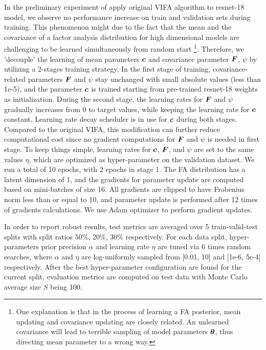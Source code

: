 \documentclass[10pt]{article} %
\begin{document}
In the preliminary experiment of apply original VIFA algorithm to resnet-18 model, we observe no performance increase on train and validation sets during training. This phenomenon might due to the fact that the mean and the covariance of a factor analysis distribution for high dimensional models are challenging to be learned simultaneously from random start \footnote{One explanation is that in the process of learning a FA posterior, mean updating and covariance updating are closely related. An unlearned covariance will lead to terrible sampling of model parameters ${\bm{\theta}}$, thus directing mean parameter to a wrong way.}. Therefore, we 'decouple' the learning of mean parameters ${\bm{c}}$ and covariance parameter ${\bm{F}}$, $\psi$ by utilizing a 2-stages training strategy. In the first stage of training, covariance-related parameters ${\bm{F}}$ and $\psi$ stay unchanged with small absolute values (less than 1e-5), and the parameter ${\bm{c}}$ is trained starting from pre-trained resnet-18 weights as initialization. During the second stage, the learning rates for ${\bm{F}}$ and $\psi$ gradually increases from 0 to target values, while keeping the learning rate for ${\bm{c}}$ constant. Learning rate decay scheduler is in use for ${\bm{c}}$ during both stages. Compared to the original VIFA, this modification can further reduce computational cost since no gradient computations for ${\bm{F}}$ and $\psi$ is needed in first stage. To keep things simple, learning rates for ${\bm{c}}$, ${\bm{F}}$, and $\psi$ are set to the same values $\eta$, which are optimized as hyper-parameter on the validation dataset. We run a total of 10 epochs, with 2 epochs in stage 1. The FA distribution has a latent dimension of 1, and the gradients for parameter update are computed based on mini-batches of size 16. All gradients are clipped to have Frobenius norm less than or equal to 10, and parameter update is performed after 12 times of gradients calculations. We use Adam optimizer \citep{kingma2014adam} to perform gradient updates.

In order to report robust results, test metrics are averaged over 5 train-valid-test splits with split ratios  50\%, 20\%, 30\% respectively. For each data split, hyper-parameters prior precision $\alpha$ and learning rate $\eta$ are tuned via 6 times random searches, where $\alpha$ and $\eta$ are log-uniformly sampled from [0.01, 10] and [1e-6, 5e-4] respectively. After the best hyper-parameter configuration are found for the current split, evaluation metrics are computed on test data with Monte Carlo average size $S$ being 100.
\end{document}
